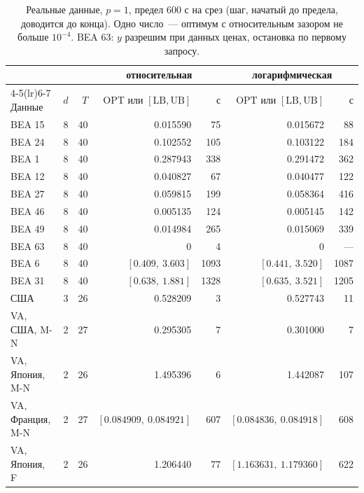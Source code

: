 \documentclass[a4paper,11pt]{article}
\theoremstyle{plain}
\theoremstyle{definition}
\theoremstyle{remark}
\newcommand{\OPT}{\mathrm{OPT}}
\newcommand{\LB}{\mathrm{LB}}
\newcommand{\UB}{\mathrm{UB}}
\begin{document}
\begin{table}[H]
\centering
\begin{tabular}{lrrrrrr}
\toprule
& & & \multicolumn{2}{c}{относительная} & \multicolumn{2}{c}{логарифмическая}\\
\cmidrule(lr){4-5}\cmidrule(lr){6-7}
Данные & $d$ & $T$ & $\OPT$ или $[\LB,\UB]$ & с & $\OPT$ или $[\LB,\UB]$ & с\\
\midrule
BEA 15 & 8 & 40 & 0.015590 & 75 & 0.015672 & 88\\
BEA 24 & 8 & 40 & 0.102552 & 105 & 0.103122 & 184\\
BEA 1 & 8 & 40 & 0.287943 & 338 & 0.291472 & 362\\
BEA 12 & 8 & 40 & 0.040827 & 67 & 0.040477 & 122\\
BEA 27 & 8 & 40 & 0.059815 & 199 & 0.058364 & 416\\
BEA 46 & 8 & 40 & 0.005135 & 124 & 0.005145 & 142\\
BEA 49 & 8 & 40 & 0.014984 & 265 & 0.015069 & 339\\
BEA 63 & 8 & 40 & 0 & 4 & 0 & ---\\
BEA 6 & 8 & 40 & $[0.409,\ 3.603]$ & 1093 & $[0.441,\ 3.520]$ & 1087\\
BEA 31 & 8 & 40 & $[0.638,\ 1.881]$ & 1328 & $[0.635,\ 3.521]$ & 1205\\
США & 3 & 26 & 0.528209 & 3 & 0.527743 & 11\\
VA, США, M-N & 2 & 27 & 0.295305 & 7 & 0.301000 & 7\\
VA, Япония, M-N & 2 & 26 & 1.495396 & 6 & 1.442087 & 107\\
VA, Франция, M-N & 2 & 27 & $[0.084909,\ 0.084921]$ & 607 & $[0.084836,\ 0.084918]$ & 608\\
VA, Япония, F & 2 & 26 & 1.206440 & 77 & $[1.163631,\ 1.179360]$ & 622\\
\bottomrule
\end{tabular}
\caption{Реальные данные, $p=1$, предел 600 с на срез (шаг, начатый до предела, доводится до конца). Одно число~--- оптимум с относительным зазором не больше $10^{-4}$. BEA 63: $y$ разрешим при данных ценах, остановка по первому запросу.}
\label{tab:real}
\end{table}
\end{document}

